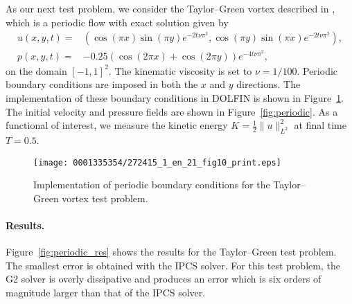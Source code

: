 As our next test problem, we consider the Taylor--Green vortex
described in \citet{CanutoHussainiQuarteroniEtAl2007}, which is a
periodic flow with exact solution given by
\begin{equation}\label{eq:periodic}
  \begin{split}
    u(x,y,t) = & (\cos (\pi x) \sin (\pi y)  e^{-2t\nu\pi^2}, \cos (\pi y)  \sin (\pi x)  e^{-2t\nu\pi^2}), \\
    p(x,y,t) = & -0.25(\cos(2\pi x ) + \cos(2\pi y ))  e^{-4t\nu\pi^2},
  \end{split}
\end{equation}
on the domain $[-1, 1]^{2}$. The kinematic viscosity is set to $\nu =
1/100$. Periodic boundary conditions are imposed in both the $x$ and
$y$ directions. The implementation of these boundary conditions in
DOLFIN is shown in Figure~\ref{fig:periodic_bcs}. The initial velocity
and pressure fields are shown in Figure~\ref{fig:periodic}. As a
functional of interest, we measure the kinetic energy $K = \frac{1}{2}
\|u\|^2_{L^2}$ at final time $T = 0.5$.

\begin{figure}[!t]
\centering
\texttt{[image: 0001335354/272415\_1\_en\_21\_fig10\_print.eps]}
\caption{Implementation of periodic boundary conditions for the
Taylor--Green vortex test problem.}\label{fig:periodic_bcs}\vspace*{6pt}
\end{figure}

\paragraph{Results.}

Figure~\ref{fig:periodic_res} shows the results for the Taylor--Green
test problem. The smallest error is obtained with the IPCS solver. For
this test problem, the G2 solver is overly dissipative and produces an
error which is six orders of magnitude larger than that of the IPCS
solver.

